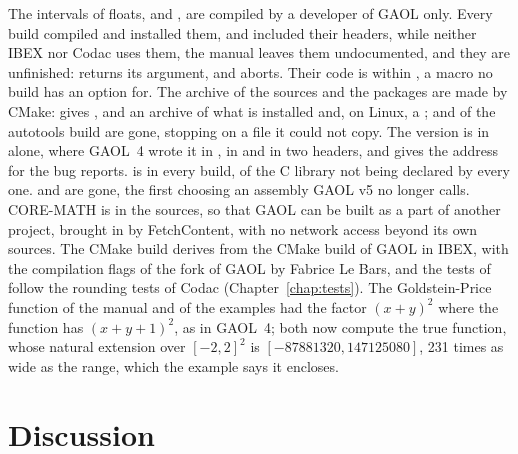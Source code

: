 \documentclass[12pt,a4paper,twoside,openright]{book}
\begin{document}
\medskip
The intervals of floats,  and ,
are compiled by a developer of GAOL only.\newinvfive{} Every build compiled
and installed them, and  included their headers, while
neither IBEX nor Codac uses them, the manual leaves them undocumented, and
they are unfinished:  returns its argument, and
 aborts. Their code is within
, a macro no build has an option for.
The archive of the sources and the packages are made by CMake:  gives ,
and  an archive of what is installed and, on Linux, a
;  and  of the autotools build are
gone,  stopping on a file it could not copy. The version is in
 alone, where GAOL~4 wrote it in , in
 and in two headers, and  gives the
address for the bug reports.  is 
in every build,  of the C library not being declared by every
one.  and
 are gone, the first choosing an assembly
GAOL v5 no longer calls. CORE-MATH is in the sources, so that GAOL can be
built as a part of another project, brought in by FetchContent, with no
network access beyond its own sources. The CMake build derives from the CMake
build of GAOL in IBEX, with the compilation flags of the fork of GAOL by
Fabrice Le Bars, and the tests of  follow the rounding tests of
Codac (Chapter~\ref{chap:tests}). The Goldstein-Price function of the manual
and of the examples had the factor $(x + y)^2$ where the function has
$(x + y + 1)^2$, as in GAOL~4; both now compute the true function, whose
natural extension over $[-2, 2]^2$ is $[-87881320, 147125080]$, 231 times as
wide as the range, which the example says it encloses.

\section{Discussion}\label{sec:changes-discussion}
\end{document}
